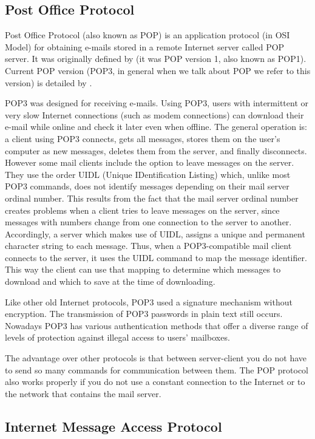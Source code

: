 \subsection{Post Office Protocol} \label{ssect:pop}

Post Office Protocol (also known as POP) is an application protocol (in OSI Model) for obtaining e-mails stored in a remote Internet server called POP server. It was originally defined by \cite{rfc918} (it was POP version 1, also known as POP1). Current POP version (POP3, in general when we talk about POP we refer to this version) is detailed by \cite{rfc1939}.

POP3 was designed for receiving e-mails. Using POP3, users with intermittent or very slow Internet connections (such as modem connections) can download their e-mail while online and check it later even when offline. The general operation is: a client using POP3 connects, gets all messages, stores them on the user's computer as new messages, deletes them from the server, and finally disconnects. However some mail clients include the option to leave messages on the server. They use the order UIDL (Unique IDentification Listing) which, unlike most POP3 commands, does not identify messages depending on their mail server ordinal number. This results from the fact that the mail server ordinal number creates problems when a client tries to leave messages on the server, since messages with numbers change from one connection to the server to another. Accordingly, a server which makes use of UIDL, assigns a unique and permanent character string to each message. Thus, when a POP3-compatible mail client connects to the server, it uses the UIDL command to map the message identifier. This way the client can use that mapping to determine which messages to download and which to save at the time of downloading.

Like other old Internet protocols, POP3 used a signature mechanism without encryption. The transmission of POP3 passwords in plain text still occurs. Nowadays POP3 has various authentication methods that offer a diverse range of levels of protection against illegal access to users' mailboxes.

The advantage over other protocols is that between server-client you do not have to send so many commands for communication between them. The POP protocol also works properly if you do not use a constant connection to the Internet or to the network that contains the mail server.

\subsection{Internet Message Access Protocol} \label{ssect:imap}

